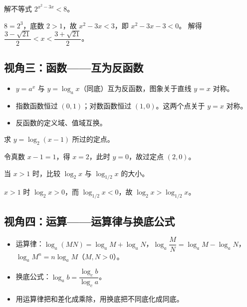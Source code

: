 \begin{explore}
\begin{problem}
解不等式 $2^{x^2-3x}<8$。
\end{problem}
\begin{solution}
$8=2^3$，底数 $2>1$，故 $x^2-3x<3$，即 $x^2-3x-3<0$。
解得 $\dfrac{3-\sqrt{21}}{2}<x<\dfrac{3+\sqrt{21}}{2}$。
\end{solution}

\subsection{视角三：函数——互为反函数}

\begin{itemize}
  \item $y=a^x$ 与 $y=\log_a x$（同底）互为反函数，图象关于直线 $y=x$ 对称。
  \item 指数函数恒过 $(0,1)$；对数函数恒过 $(1,0)$。这两个点关于 $y=x$ 对称。
  \item 反函数的定义域、值域互换。
\end{itemize}

\begin{example}
求 $y=\log_2(x-1)$ 所过的定点。
\end{example}
\begin{solution}
令真数 $x-1=1$，得 $x=2$，此时 $y=0$，故过定点 $(2,0)$。
\end{solution}

\begin{problem}
当 $x>1$ 时，比较 $\log_2 x$ 与 $\log_{1/2} x$ 的大小。
\end{problem}
\begin{solution}
$x>1$ 时 $\log_2 x>0$，而 $\log_{1/2} x<0$，故 $\log_2 x>\log_{1/2} x$。
\end{solution}

\subsection{视角四：运算——运算律与换底公式}

\begin{itemize}
  \item 运算律：$\log_a(MN)=\log_a M+\log_a N$，$\log_a\dfrac{M}{N}=\log_a M-\log_a N$，
        $\log_a M^n=n\log_a M$（$M,N>0$）。
  \item 换底公式：$\log_a b=\dfrac{\log_c b}{\log_c a}$。
  \item 用运算律把和差化成乘除，用换底把不同底化成同底。
\end{itemize}


\end{explore}

